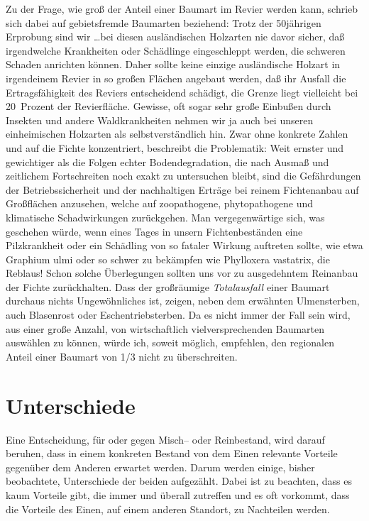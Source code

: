 \documentclass[twocolumn]{scrartcl}
\begin{document}
Zu der Frage, wie groß der Anteil einer Baumart im Revier werden kann,
schrieb \citet[S.~233]{wiedemann1951Ertragskunde} sich dabei auf
gebietsfremde Baumarten beziehend: \frqq Trotz der 50jährigen
Erprobung sind wir \dots bei diesen ausländischen Holzarten nie davor
sicher, daß irgendwelche Krankheiten oder Schädlinge eingeschleppt
werden, die schweren Schaden anrichten können. Daher sollte keine
einzige ausländische Holzart in irgendeinem Revier in so großen
Flächen angebaut werden, daß ihr Ausfall die Ertragsfähigkeit des
Reviers entscheidend schädigt, die Grenze liegt vielleicht bei
20~Prozent der Revierfläche. Gewisse, oft sogar sehr große Einbußen
durch Insekten und andere Waldkrankheiten nehmen wir ja auch bei
unseren einheimischen Holzarten als selbstverständlich hin.\flqq{}
Zwar ohne konkrete Zahlen und auf die Fichte konzentriert, beschreibt
\citet[S.~394]{assmann1961Waldertraskunde} die Problematik: \frqq Weit
ernster und gewichtiger als die Folgen echter Bodendegradation, die
nach Ausmaß und zeitlichem Fortschreiten noch exakt zu untersuchen
bleibt, sind die Gefährdungen der Betriebssicherheit und der
nachhaltigen Erträge bei reinem Fichtenanbau auf Großflächen
anzusehen, welche auf zoopathogene, phytopathogene und klimatische
Schadwirkungen zurückgehen. Man vergegenwärtige sich, was geschehen
würde, wenn eines Tages in unsern Fichtenbeständen eine Pilzkrankheit
oder ein Schädling von so fataler Wirkung auftreten sollte, wie etwa
Graphium ulmi oder so schwer zu bekämpfen wie Phylloxera vastatrix,
die Reblaus! Schon solche Überlegungen sollten uns vor zu ausgedehntem
Reinanbau der Fichte zurückhalten.\flqq{} Dass der großräumige
\emph{Totalausfall} einer Baumart durchaus nichts Ungewöhnliches ist,
zeigen, neben dem erwähnten Ulmensterben, auch Blasenrost oder
Eschentriebsterben. Da es nicht immer der Fall sein wird, aus einer
große Anzahl, von wirtschaftlich vielversprechenden Baumarten
auswählen zu können, würde ich, soweit möglich, empfehlen, den
regionalen Anteil einer Baumart von 1/3 nicht zu überschreiten.

\section{Unterschiede}
\label{sec:unterschiede}

Eine Entscheidung, für oder gegen Misch-- oder Reinbestand, wird
darauf beruhen, dass in einem konkreten Bestand von dem Einen
relevante Vorteile gegenüber dem Anderen erwartet werden. Darum werden
einige, bisher beobachtete, Unterschiede der beiden aufgezählt. Dabei
ist zu beachten, dass es kaum Vorteile gibt, die immer und überall
zutreffen und es oft vorkommt, dass die Vorteile des Einen, auf einem
anderen Standort, zu Nachteilen werden.
\end{document}
